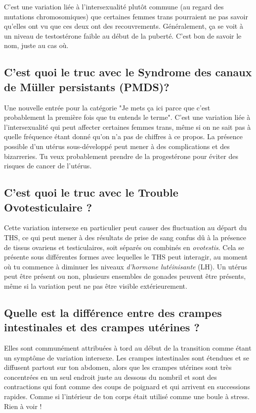 \documentclass{article}
\begin{document}
C'est une variation liée à l'intersexualité plutôt commune (au regard des mutations chromosomiques) que certaines femmes trans pourraient ne pas savoir qu'elles ont vu que ces deux ont des recouvrements. Généralement, ça se voit à un niveau de testostérone faible au début de la puberté. C'est bon de savoir le nom, juste au cas où.

\subsection{C'est quoi le truc avec le Syndrome des canaux de Müller persistants (PMDS)?}

Une nouvelle entrée pour la catégorie "Je mets ça ici parce que c'est probablement la première fois que tu entends le terme". C'est une variation liée à l'intersexualité qui peut affecter certaines femmes trans, même si on ne sait pas à quelle fréquence étant donné qu'on n'a pas de chiffres à ce propos. La présence possible d'un utérus sous-développé peut mener à des complications et des bizarreries. Tu veux probablement prendre de la progestérone pour éviter des risques de cancer de l'utérus.

\subsection{C'est quoi le truc avec le Trouble Ovotesticulaire ?}

Cette variation intersexe en particulier peut causer des fluctuation au départ du THS, ce qui peut mener à des résultats de prise de sang confus dû à la présence de tissus ovariens et testiculaires, soit séparés ou combinés en \textit{ovotestis}. Cela se présente sous différentes formes avec lequelles le THS peut interagir, au moment où tu commence à diminuer les niveaux \textit{d'hormone lutéinisante} (LH). Un utérus peut être présent ou non, plusieurs ensembles de gonades peuvent être présents, même si la variation peut ne pas être visible extérieurement.

\subsection{Quelle est la différence entre des crampes intestinales et des crampes utérines ?}\label{11-35}

Elles sont communément attribuées à tord au début de la transition comme étant un symptôme de variation intersexe. Les crampes intestinales sont étendues et se diffusent partout sur ton abdomen, alors que les crampes utérines sont très concentrées en un seul endroit juste au dessous du nombril et sont des contractions qui font comme des coups de poignard et qui arrivent en successions rapides. Comme si l'intérieur de ton corps était utilisé comme une boule à stress. Rien à voir !
\end{document}
